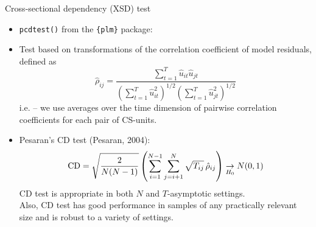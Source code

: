 \documentclass[usenames,dvipsnames]{beamer}
\begin{document}
\begin{frame}{Cross-sectional dependency (XSD) test}
\small
\begin{itemize}
    \item \texttt{pcdtest()} from the \texttt{\{plm\}} package:
    \medskip
    \item Test based on transformations of the correlation coefficient of model residuals, defined as
    $$
    \hat{\rho}_{ij}=\frac{\sum_{t=1}^T \hat{u}_{it}\hat{u}_{jt}}
    {\left(\sum_{t=1}^T \hat{u}_{it}^2 \right)^{1/2} \left(\sum_{t=1}^T \hat{u}_{jt}^2 \right)^{1/2} }
    $$
    i.e. -- we use averages over the time dimension of pairwise correlation coefficients for each pair of CS-units.
    \bigskip
    \item Pesaran's CD test (Pesaran, 2004):
    $$
    \textnormal{CD} = \sqrt{\frac{2}{N(N-1)}}
    \left( \sum_{i=1}^{N-1} \sum_{j=i+1}^N \sqrt{T_{ij}}\, \hat{\rho}_{ij}
    \right)  \underset{H_0}{\rightarrow} N(0,1)
    $$
    CD test is appropriate in both $N$ and $T$-asymptotic settings. \\Also, CD test has good performance in samples of any practically relevant size and is robust to a variety of settings.
\end{itemize}
\end{frame}
\end{document}
